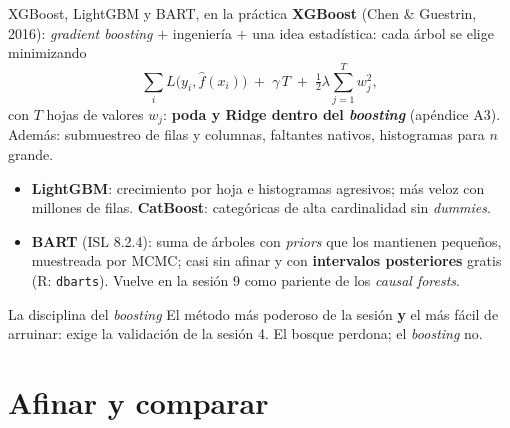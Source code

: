 \documentclass{beamer}
\newcommand{\1}{\mathbb{I}}
\begin{document}
\begin{frame}{XGBoost, LightGBM y BART, en la práctica}
\small
\textbf{XGBoost} (Chen \& Guestrin, 2016): \emph{gradient boosting} $+$ ingeniería $+$ una idea estadística: cada árbol se elige minimizando
\[ \sum_i L\big(y_i, \hat{f}(x_i)\big) \;+\; \gamma\, T \;+\; \tfrac{1}{2}\lambda \sum_{j=1}^{T} w_j^2, \]
con $T$ hojas de valores $w_j$: \textbf{poda y Ridge dentro del \emph{boosting}} (apéndice A3). Además: submuestreo de filas y columnas, faltantes nativos, histogramas para $n$ grande.
\pause
\begin{itemize}\itemsep1pt
  \item \textbf{LightGBM}: crecimiento por hoja e histogramas agresivos; más veloz con millones de filas. \textbf{CatBoost}: categóricas de alta cardinalidad sin \emph{dummies}.
  \item \textbf{BART} (ISL 8.2.4): suma de árboles con \emph{priors} que los mantienen pequeños, muestreada por MCMC; casi sin afinar y con \textbf{intervalos posteriores} gratis (R: \texttt{dbarts}). Vuelve en la sesión 9 como pariente de los \emph{causal forests}. \pause
\end{itemize}
\begin{block}{La disciplina del \emph{boosting}}
El método más poderoso de la sesión \textbf{y} el más fácil de arruinar: exige la validación de la sesión 4. El bosque perdona; el \emph{boosting} no.
\end{block}
\end{frame}


\section{Afinar y comparar}
\begin{frame}[noframenumbering]
\tableofcontents[currentsection]
\end{frame}
\end{document}

